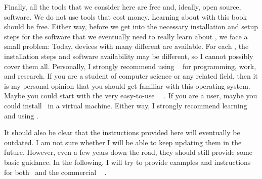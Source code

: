 Finally, all the tools that we consider here are free and, ideally, open source, software.
We do not use tools that cost money.
Learning about  with this book should be free.%
%
%
%
Either way, before we get into the necessary installation and setup steps for the software that we eventually need to really learn about , we face a small problem:
Today, devices with many different  are available.
For each , the installation steps and software availability may be different, so I cannot possibly cover them all.
Personally, I strongly recommend using \linux~\cite{T1999TLE,B2022ELATCL,H2022LML} for programming, work, and research.
If you are a student of computer science or any related field, then it is my personal opinion that you should get familiar with this operating system.
%
%
%
Maybe you could start with the very easy-to-use \ubuntu\ \linux~\cite{CN2020ULB,H2020ULU2E}.
If you are a \microsoftWindows\cite{B2023W1IO} user, maybe you could install \ubuntu\ in a virtual machine.
Either way, I strongly recommend learning and using \linux.

It should also be clear that the instructions provided here will eventually be outdated.
I am not sure whether I will be able to keep updating them in the future.
However, even a few years down the road, they should still provide some basic guidance.
In the following, I will try to provide examples and instructions for both \ubuntu\ and the commercial \microsoftWindows~\cite{B2023W1IO} .%
%
%
%
%
%
%
%
\endhsection%
%
